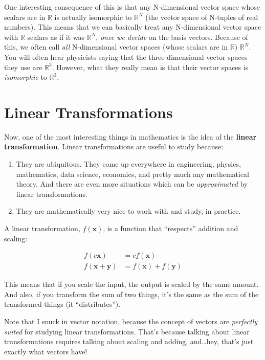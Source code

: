 \documentclass[]{article}
\begin{document}
One interesting consequence of this is that any N-dimensional vector space whose
scalars are in \(\mathbb{R}\) is actually isomorphic to \(\mathbb{R}^N\) (the
vector space of N-tuples of real numbers). This means that we can basically
treat any N-dimensional vector space with \(\mathbb{R}\) scalars as if it was
\(\mathbb{R}^N\), \emph{once we decide} on the basis vectors. Because of this,
we often call \emph{all} N-dimensional vector spaces (whose scalars are in
\(\mathbb{R}\)) \(\mathbb{R}^N\). You will often hear physicists saying that the
three-dimensional vector spaces they use are \(\mathbb{R}^3\). However, what
they really mean is that their vector spaces is \emph{isomorphic} to
\(\mathbb{R}^3\).

\hypertarget{linear-transformations}{%
\section{Linear Transformations}\label{linear-transformations}}

Now, one of the most interesting things in mathematics is the idea of the
\textbf{linear transformation}. Linear transformations are useful to study
because:

\begin{enumerate}
\def\labelenumi{\arabic{enumi}.}
\tightlist
\item
  They are ubiquitous. They come up everywhere in engineering, physics,
  mathematics, data science, economics, and pretty much any mathematical theory.
  And there are even more situations which can be \emph{approximated} by linear
  transformations.
\item
  They are mathematically very nice to work with and study, in practice.
\end{enumerate}

A linear transformation, \(f(\mathbf{x})\), is a function that ``respects''
addition and scaling:

\[
\begin{aligned}
f(c\mathbf{x}) & = c f(\mathbf{x}) \\
f(\mathbf{x} + \mathbf{y}) & = f(\mathbf{x}) + f(\mathbf{y})
\end{aligned}
\]

This means that if you scale the input, the output is scaled by the same amount.
And also, if you transform the sum of two things, it's the same as the sum of
the transformed things (it ``distributes'').

Note that I snuck in vector notation, because the concept of vectors are
\emph{perfectly suited} for studying linear transformations. That's because
talking about linear transformations requires talking about scaling and adding,
and\ldots hey, that's just exactly what vectors have!
\end{document}
